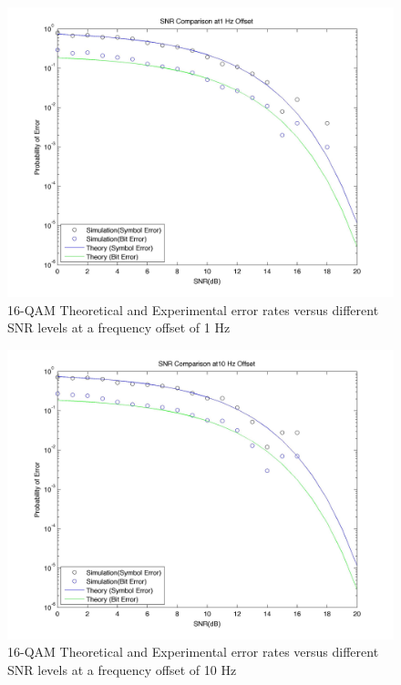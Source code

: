 \documentclass[]{article}
\begin{document}
\begin{figure}[H]
\centering
\hspace*{-2cm}\includegraphics[width=1.3\textwidth]{qam16SNRfo3.jpg}
\caption{16-QAM Theoretical and Experimental error rates versus different SNR levels at a frequency offset of 1 Hz}
\end{figure}

\begin{figure}[H]
\centering
\hspace*{-2cm}\includegraphics[width=1.3\textwidth]{qam16SNRfo4.jpg}
\caption{16-QAM Theoretical and Experimental error rates versus different SNR levels at a frequency offset of 10 Hz}
\end{figure}
\end{document}
